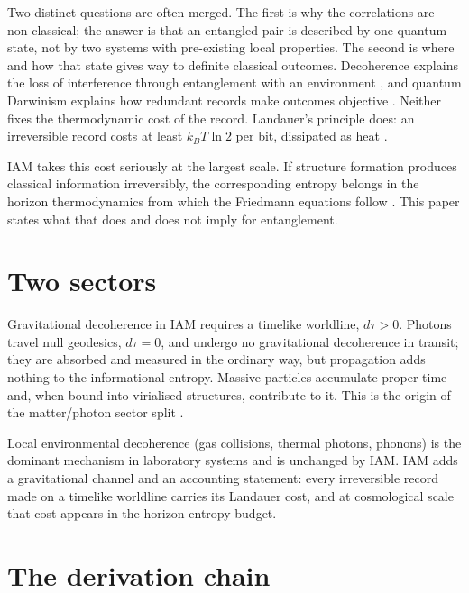 \documentclass[12pt,a4paper]{article}
\begin{document}
Two distinct questions are often merged. The first is why the correlations are
non-classical; the answer is that an entangled pair is described by one quantum
state, not by two systems with pre-existing local properties. The second is where
and how that state gives way to definite classical outcomes. Decoherence explains
the loss of interference through entanglement with an environment
\citep{Zurek1981,JoosZeh1985}, and quantum Darwinism explains how redundant records
make outcomes objective \citep{Zurek2003,Zurek2009}. Neither fixes the
thermodynamic cost of the record. Landauer's principle does: an irreversible
record costs at least $k_BT\ln2$ per bit, dissipated as heat \citep{Landauer1961}.

IAM takes this cost seriously at the largest scale. If structure formation produces
classical information irreversibly, the corresponding entropy belongs in the
horizon thermodynamics from which the Friedmann equations follow
\citep{Jacobson1995,CaiKim2005}. This paper states what that does and does not
imply for entanglement.

\section{Two sectors}
\label{sec:sectors}

Gravitational decoherence in IAM requires a timelike worldline, $d\tau>0$. Photons
travel null geodesics, $d\tau=0$, and undergo no gravitational decoherence in
transit; they are absorbed and measured in the ordinary way, but propagation adds
nothing to the informational entropy. Massive particles accumulate proper time and,
when bound into virialised structures, contribute to it. This is the origin of the
matter/photon sector split \citep{IAM_time}.

Local environmental decoherence (gas collisions, thermal photons, phonons) is the
dominant mechanism in laboratory systems and is unchanged by IAM. IAM adds a
gravitational channel and an accounting statement: every irreversible record made
on a timelike worldline carries its Landauer cost, and at cosmological scale that
cost appears in the horizon entropy budget.

\section{The derivation chain}
\label{sec:derivation}
\end{document}

